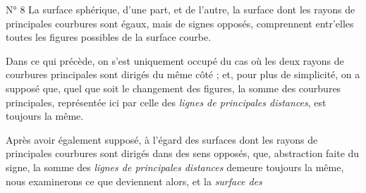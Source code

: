 \documentclass[11pt,a4paper]{article}
\begin{document}
N° 8 La surface sphérique, d'une part, et de l'autre, la surface dont les rayons
de principales courbures sont égaux, mais de signes opposés, comprennent
entr'elles toutes les figures possibles de la surface courbe.

Dans ce qui précède, on s'est uniquement occupé du cas où les deux rayons de
courbures principales sont dirigés du même côté ; et, pour plus de
simplicité, on a supposé que, quel que soit le changement des figures, la
somme des courbures principales, représentée ici par celle des \emph{lignes
de principales distances}, est toujours la même.

Après avoir également supposé, à l'égard des surfaces dont les rayons de
principales courbures sont dirigés dans des sens opposés, que, abstraction
faite du signe, la somme des \emph{lignes de principales distances} demeure
toujours la même, nous examinerons ce que deviennent alors, et la
\emph{surface des}

\end{document}
